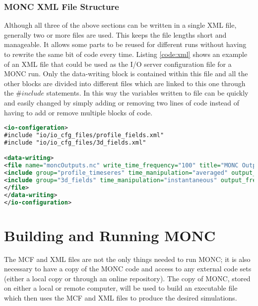 \subsubsection{MONC XML File Structure}
Although all three of the above sections can be written in a single XML file, generally two or more files are used. This keeps the file lengths short and manageable. It allows some parts to be reused for different runs without having to rewrite the same bit of code every time. Listing \ref{code:xml} shows an example of an XML file that could be used as the I/O server configuration file for a MONC run. Only the data-writing block is contained within this file and all the other blocks are divided into different files which are linked to this one through the $\#include$ statements. In this way the variables written to file can be quickly and easily changed by simply adding or removing two lines of code instead of having to add or remove multiple blocks of code. \citep{moncCode}
\newpage
\begin{lstlisting}[language=XML,caption=Example of a MONC XML file that links to other XML files for data definition and processing blocks.,label={code:xml},belowskip=-1cm]
<io-configeration>
#include "io/io_cfg_files/profile_fields.xml"
#include "io/io_cfg_files/3d_fields.xml"

<data-writing>
<file name="moncOutputs.nc" write_time_frequency="100" title="MONC Outputs">
<include group="profile_timeseres" time_manipulation="averaged" output_frequency="10.0">
<include group="3d_fields" time_manipulation="instantaneous" output_frequency="5.0">
</file>
</data-writing>
</io-configuration>
\end{lstlisting}

\section{Building and Running MONC} \label{ch:build}
The MCF and XML files are not the only things needed to run MONC; it is also necessary to have a copy of the MONC code and access to any external code sets (either a local copy or through an online repository). The copy of MONC, stored on either a local or remote computer, will be used to build an executable file which then uses the MCF and XML files to produce the desired simulations. \citep{moncGuides}

